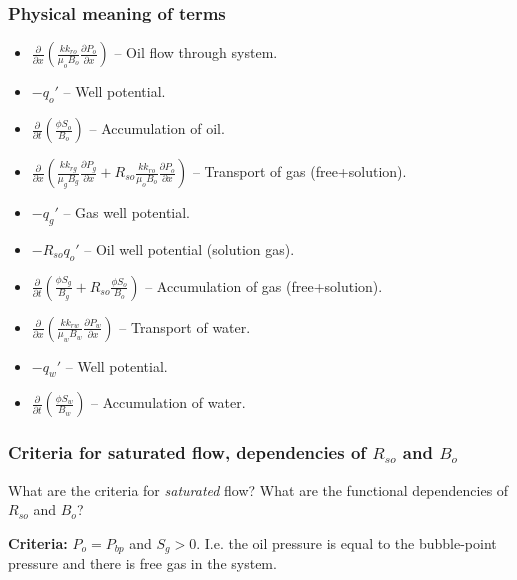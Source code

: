 \subsubsection{Physical meaning of terms} %
\label{ssub:physical_meaning_of_terms}
\begin{itemize}
  \item $\frac{\partial}{\partial x}\left(\frac{kk_{ro}}{\mu_{o}B_{o}}\frac{\partial P_{o}}{\partial x}\right)$ -- Oil flow through system.
  \item $-q_{o}'$ -- Well potential.
  \item $\frac{\partial}{\partial t}\left(\frac{\phi S_{o}}{B_{o}}\right)$ -- Accumulation of oil.
  \item $\frac{\partial}{\partial x}\left(\frac{kk_{rg}}{\mu_{g}B_{g}}\frac{\partial P_{g}}{\partial x}+R_{so}\frac{kk_{ro}}{\mu_{o}B_{o}}\frac{\partial P_{o}}{\partial x}\right)$ -- Transport of gas (free+solution).
  \item $-q_{g}'$ -- Gas well potential.
  \item $-R_{so}q_{o}'$ -- Oil well potential (solution gas).
  \item $\frac{\partial}{\partial t}\left(\frac{\phi S_{g}}{B_{g}}+R_{so}\frac{\phi S_{o}}{B_{o}}\right)$ -- Accumulation of gas (free+solution).
  \item $\frac{\partial}{\partial x}\left(\frac{kk_{rw}}{\mu_{w}B_{w}}\frac{\partial P_{w}}{\partial x}\right)$ -- Transport of water.
  \item $-q_{w}'$ -- Well potential.
  \item $\frac{\partial}{\partial t}\left(\frac{\phi S_{w}}{B_{w}}\right)$ -- Accumulation of water.
\end{itemize}

\subsubsection{Criteria for saturated flow, dependencies of $R_{so}$ and $B_o$} %
\label{ssub:criteria_for_saturated_flow_dependencies_of_r__so_and_b_o_}

\begin{question}
  What are the criteria for \emph{saturated} flow? What are the functional dependencies of $R_{so}$ and $B_o$?
\end{question}

\noindent \textbf{Criteria:} $P_o = P_{bp}$ and $S_g > 0$. I.e. the oil pressure is equal to the bubble-point pressure and there is free gas in the system.

